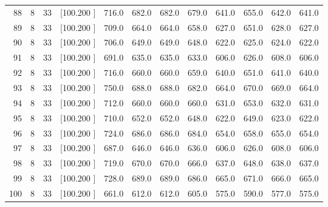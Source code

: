 \documentclass[12pt,a4paper]{article}
\begin{document}
\begin{center}
{\begin{tabular}{r r r r r r r r r r r r}
  88&  8& 33&[100.200   ]&   716.0&   682.0&   682.0&   679.0&   641.0&   655.0&   642.0&   641.0\\[-0.02in]
  89&  8& 33&[100.200   ]&   709.0&   664.0&   664.0&   658.0&   627.0&   651.0&   628.0&   627.0\\[-0.02in]
  90&  8& 33&[100.200   ]&   706.0&   649.0&   649.0&   648.0&   622.0&   625.0&   624.0&   622.0\\[-0.02in]
  91&  8& 33&[100.200   ]&   691.0&   635.0&   635.0&   633.0&   606.0&   626.0&   608.0&   606.0\\[-0.02in]
  92&  8& 33&[100.200   ]&   716.0&   660.0&   660.0&   659.0&   640.0&   651.0&   641.0&   640.0\\[-0.02in]
  93&  8& 33&[100.200   ]&   750.0&   688.0&   688.0&   682.0&   664.0&   670.0&   669.0&   664.0\\[-0.02in]
  94&  8& 33&[100.200   ]&   712.0&   660.0&   660.0&   660.0&   631.0&   653.0&   632.0&   631.0\\[-0.02in]
  95&  8& 33&[100.200   ]&   710.0&   652.0&   652.0&   648.0&   622.0&   649.0&   623.0&   622.0\\[-0.02in]
  96&  8& 33&[100.200   ]&   724.0&   686.0&   686.0&   684.0&   654.0&   658.0&   655.0&   654.0\\[-0.02in]
  97&  8& 33&[100.200   ]&   687.0&   646.0&   646.0&   636.0&   606.0&   626.0&   608.0&   606.0\\[-0.02in]
  98&  8& 33&[100.200   ]&   719.0&   670.0&   670.0&   666.0&   637.0&   648.0&   638.0&   637.0\\[-0.02in]
  99&  8& 33&[100.200   ]&   728.0&   689.0&   689.0&   686.0&   665.0&   671.0&   666.0&   665.0\\[-0.02in]
 100&  8& 33&[100.200   ]&   661.0&   612.0&   612.0&   605.0&   575.0&   590.0&   577.0&   575.0\\[-0.02in]

\hline
\end{tabular}}
\end{center}
\end{document}
